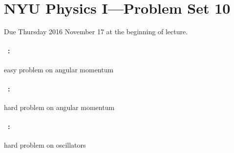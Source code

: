 \documentclass[12pt]{article}
\begin{document}
\section*{NYU Physics I---Problem Set 10}

Due Thursday 2016 November 17 at the beginning of lecture.

\paragraph{\problemname~\theproblem:}%
easy problem on angular momentum

\paragraph{\problemname~\theproblem:}%
hard problem on angular momentum

\paragraph{\problemname~\theproblem:}%
hard problem on oscillators
\end{document}
